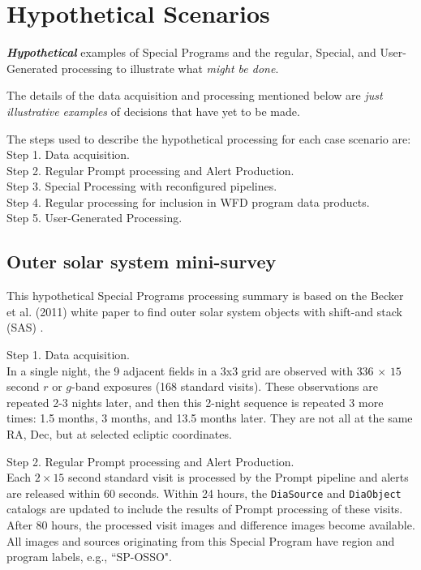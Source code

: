\section{Hypothetical Scenarios}\label{sec:spcs}

\textbf{\emph{Hypothetical}} examples of Special Programs
and the regular, Special, and User-Generated processing
to illustrate what \emph{might be done}.

The details of the data acquisition and processing mentioned below are 
\emph{just illustrative examples} of decisions that have yet to be made.

The steps used to describe the hypothetical processing for each case scenario are: \\
Step 1. Data acquisition. \\
Step 2. Regular Prompt processing and Alert Production. \\
Step 3. Special Processing with reconfigured pipelines. \\
Step 4. Regular processing for inclusion in WFD program data products. \\
Step 5. User-Generated Processing. \\

\subsection{Outer solar system mini-survey}\label{ssec:SPCS_TNO}

This hypothetical Special Programs processing summary is based on the Becker et al. (2011) 
white paper to find outer solar system objects with shift-and stack (SAS) .

Step 1. Data acquisition. \\
In a single night, the 9 adjacent fields in a 3x3 grid are observed with 
$336$ $\times$ $15$ second $r$ or $g$-band exposures (168 standard visits). 
These observations are repeated 2-3 nights later, and then this 2-night sequence
is repeated 3 more times: 1.5 months, 3 months, and 13.5 months later. 
They are not all at the same RA, Dec, but at selected ecliptic coordinates.

Step 2. Regular Prompt processing and Alert Production. \\
Each $2\times15$ second standard visit is processed by the Prompt pipeline 
and alerts are released within 60 seconds.
Within 24 hours, the {\tt DiaSource} and {\tt DiaObject} catalogs are updated
to include the results of Prompt processing of these visits.
After 80 hours, the processed visit images and difference images become available.
All images and sources originating from this Special Program have 
region and program labels, e.g., ``SP-OSSO".

